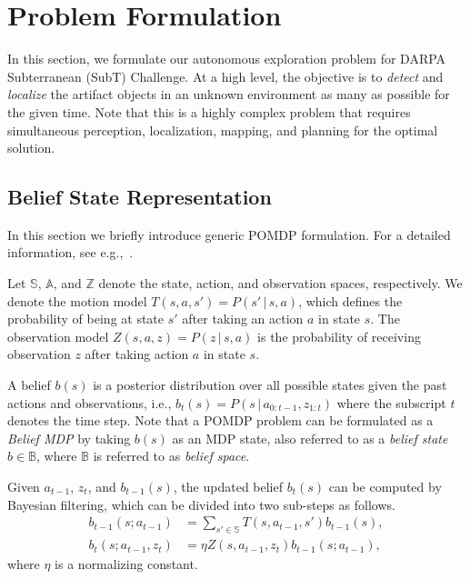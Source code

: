 \documentclass[letterpaper, 10 pt, conference]{ieeeconf}  %
\begin{document}
\section{Problem Formulation}

In this section, we formulate our autonomous exploration problem for DARPA Subterranean (SubT) Challenge.
At a high level, the objective is to \textit{detect} and \textit{localize} the artifact objects in an unknown environment as many as possible for the given time.
Note that this is a highly complex problem that requires simultaneous perception, localization, mapping, and planning for the optimal solution.

\subsection{Belief State Representation}

In this section we briefly introduce generic POMDP formulation.
For a detailed information, see e.g.,~\cite{Bertsekas05,TBF05,RN10}.

Let $\mathbb{S}$, $\mathbb{A}$, and $\mathbb{Z}$ denote the state, action, and observation spaces, respectively.
We denote the motion model $T(s, a, s') = P(s'\,|\,s, a)$, which defines the probability of being at state $s'$ after taking an action $a$ in state $s$.
The observation model $Z(s, a, z) = P(z\,|\,s, a)$ is the probability of receiving observation $z$ after taking action $a$ in state $s$. 

A belief $b(s)$ is a posterior distribution over all possible states given the past actions and observations, i.e., $b_{t}(s) = P(s \,|\, a_{0:t-1}, z_{1:t})$ where the subscript $t$ denotes the time step.
Note that a POMDP problem can be formulated as a \textit{Belief MDP} by taking $b(s)$ as an MDP state, also referred to as a \textit{belief state} $b \in \mathbb{B}$, where $\mathbb{B}$ is referred to as \textit{belief space}.

Given $a_{t-1}$, $z_t$, and $b_{t-1}(s)$,
the updated belief $b_t(s)$ can be computed by Bayesian filtering, which can be divided into two sub-steps as follows.
\begin{align}
  b_{t-1}(s; a_{t-1}) &= \sum_{s' \in \mathbb{S}} T(s, a_{t-1}, s') b_{t-1}(s),
  \label{eq:prediction}
  \\
  b_t(s; a_{t-1}, z_t) &= \eta Z(s, a_{t-1}, z_t) b_{t-1}(s; a_{t-1}),
  \label{eq:correction}
\end{align}
where $\eta$ is a normalizing constant.
\end{document}
